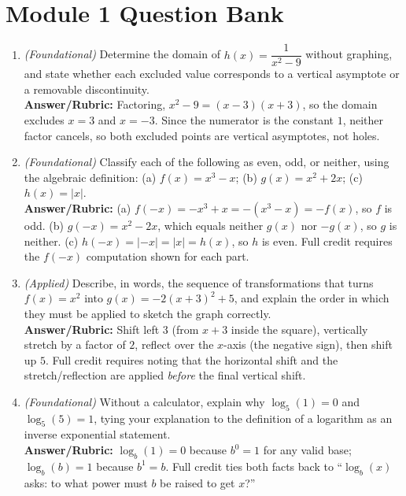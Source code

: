 \documentclass{article}
\begin{document}
\section*{Module 1 Question Bank}

\begin{enumerate}[leftmargin=*]
  \item \textit{(Foundational)} Determine the domain of $h(x)=\dfrac{1}{x^2-9}$ without graphing, and state whether each excluded value corresponds to a vertical asymptote or a removable discontinuity. \\
  \textbf{Answer/Rubric:} Factoring, $x^2-9=(x-3)(x+3)$, so the domain excludes $x=3$ and $x=-3$. Since the numerator is the constant $1$, neither factor cancels, so both excluded points are vertical asymptotes, not holes.

  \item \textit{(Foundational)} Classify each of the following as even, odd, or neither, using the algebraic definition: (a) $f(x)=x^3-x$; (b) $g(x)=x^2+2x$; (c) $h(x)=|x|$. \\
  \textbf{Answer/Rubric:} (a) $f(-x)=-x^3+x=-(x^3-x)=-f(x)$, so $f$ is odd. (b) $g(-x)=x^2-2x$, which equals neither $g(x)$ nor $-g(x)$, so $g$ is neither. (c) $h(-x)=|-x|=|x|=h(x)$, so $h$ is even. Full credit requires the $f(-x)$ computation shown for each part.

  \item \textit{(Applied)} Describe, in words, the sequence of transformations that turns $f(x)=x^2$ into $g(x)=-2(x+3)^2+5$, and explain the order in which they must be applied to sketch the graph correctly. \\
  \textbf{Answer/Rubric:} Shift left $3$ (from $x+3$ inside the square), vertically stretch by a factor of $2$, reflect over the $x$-axis (the negative sign), then shift up $5$. Full credit requires noting that the horizontal shift and the stretch/reflection are applied \emph{before} the final vertical shift.

  \item \textit{(Foundational)} Without a calculator, explain why $\log_5(1)=0$ and $\log_5(5)=1$, tying your explanation to the definition of a logarithm as an inverse exponential statement. \\
  \textbf{Answer/Rubric:} $\log_b(1)=0$ because $b^0=1$ for any valid base; $\log_b(b)=1$ because $b^1=b$. Full credit ties both facts back to ``$\log_b(x)$ asks: to what power must $b$ be raised to get $x$?''


\end{enumerate}
\end{document}
